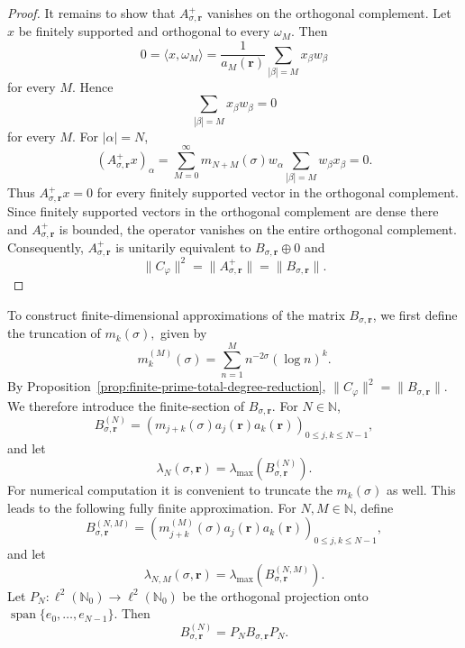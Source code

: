 \documentclass[12pt, reqno]{amsart}
\numberwithin{equation}{section}
\begin{document}
\begin{proof}
It remains to show that \(A_{\sigma,\boldsymbol{r}}^{+}\) vanishes on the orthogonal complement. Let \(x\) be finitely supported and orthogonal to every \(\omega_M\). Then
\[
0=\langle x,\omega_M\rangle
=
\frac{1}{a_M(\boldsymbol{r})}
\sum_{|\beta|=M}x_{\beta}w_{\beta}
\]
for every \(M\). Hence
\[
\sum_{|\beta|=M}x_{\beta}w_{\beta}=0
\]
for every \(M\). For \(|\alpha|=N\),
\[
(A_{\sigma,\boldsymbol{r}}^{+}x)_{\alpha}
=
\sum_{M=0}^{\infty}
m_{N+M}(\sigma)w_{\alpha}
\sum_{|\beta|=M}w_{\beta}x_{\beta}
=
0.
\]
Thus $A_{\sigma,\boldsymbol{r}}^{+}x=0$
for every finitely supported vector in the orthogonal complement.
%
Since finitely supported vectors in the orthogonal complement are dense
there and \(A_{\sigma,\boldsymbol r}^{+}\) is bounded, the operator
vanishes on the entire orthogonal complement.
%
Consequently, $A_{\sigma,\boldsymbol{r}}^{+}$
is unitarily equivalent to
$B_{\sigma,\boldsymbol{r}}\oplus 0$ and
\[
\|C_{\varphi}\|^{2}
=\|A_{\sigma,\boldsymbol{r}}^{+}\|=\|B_{\sigma,\boldsymbol{r}}\|. \]
\end{proof}
To construct finite-dimensional approximations of the matrix $B_{\sigma,\boldsymbol{r}}$, we first define the truncation of $m_k(\sigma),$ given by
\[
m_k^{(M)}(\sigma)
=
\sum_{n=1}^{M}
n^{-2\sigma}(\log n)^k.
\]
By Proposition~\ref{prop:finite-prime-total-degree-reduction}, $\|C_{\varphi}\|^2 = \|B_{\sigma,\boldsymbol{r}}\|$. We therefore introduce the  finite-section of $B_{\sigma,\boldsymbol{r}}$.
For $N\in\mathbb{N}$,
\[
B_{\sigma,\boldsymbol{r}}^{(N)}
=
\left(
m_{j+k}(\sigma)a_j(\boldsymbol{r})a_k(\boldsymbol{r})
\right)_{0\le j,k\le N-1},
\]
and let
\[
\lambda_N(\sigma,\boldsymbol{r})
=
\lambda_{\max}(B_{\sigma,\boldsymbol{r}}^{(N)}).
\]
For numerical computation it is convenient to truncate the $m_k(\sigma)$ as well. This leads to the following fully finite approximation.
For $N,M\in\mathbb N$, define
\[
B_{\sigma,\boldsymbol{r}}^{(N,M)}
=
\left(
m_{j+k}^{(M)}(\sigma)a_j(\boldsymbol{r})a_k(\boldsymbol{r})
\right)_{0\le j,k\le N-1},
\]
and let
\[
\lambda_{N,M}(\sigma,\boldsymbol{r})
=
\lambda_{\max}(B_{\sigma,\boldsymbol{r}}^{(N,M)}).
\]
Let $P_N:\ell^2(\mathbb N_0)\to\ell^2(\mathbb N_0)$ be the orthogonal projection onto
$\operatorname{span}\{e_0,\ldots,e_{N-1}\}.$ Then
\[
B_{\sigma,\boldsymbol{r}}^{(N)} = P_NB_{\sigma,\boldsymbol{r}}P_N.
\]
\end{document}
